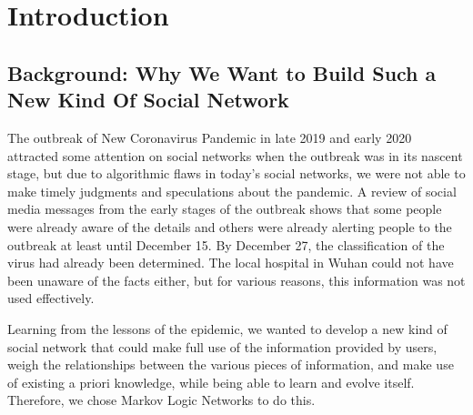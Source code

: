 \documentclass[
12pt, %
a4paper, %
oneside, %
headinclude,footinclude, %
BCOR5mm, %
]{scrartcl}
\begin{document}

\let\thefootnote\relax{}




\newpage %

\section{Introduction}

\subsection{Background: Why We Want to Build Such a New Kind Of Social Network}

The outbreak of New Coronavirus Pandemic in late 2019 and early 2020 attracted some attention on social networks when the outbreak was in its nascent stage, but due to algorithmic flaws in today's social networks, we were not able to make timely judgments and speculations about the pandemic. A review of social media messages from the early stages of the outbreak shows that some people were already aware of the details and others were already alerting people to the outbreak at least until December 15. By December 27, the classification of the virus had already been determined. The local hospital in Wuhan could not have been unaware of the facts either, but for various reasons, this information was not used effectively.

Learning from the lessons of the epidemic, we wanted to develop a new kind of social network that could make full use of the information provided by users, weigh the relationships between the various pieces of information, and make use of existing a priori knowledge, while being able to learn and evolve itself. Therefore, we chose Markov Logic Networks to do this.
\end{document}
